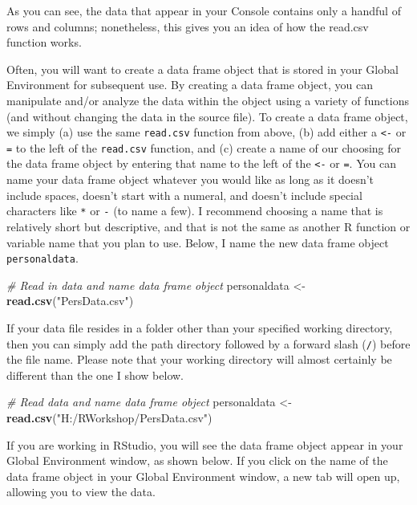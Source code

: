 \documentclass[]{book}
\newenvironment{Shaded}{\begin{snugshade}}{\end{snugshade}}
\newcommand{\KeywordTok}[1]{\textcolor[rgb]{0.13,0.29,0.53}{\textbf{#1}}}
\newcommand{\StringTok}[1]{\textcolor[rgb]{0.31,0.60,0.02}{#1}}
\newcommand{\CommentTok}[1]{\textcolor[rgb]{0.56,0.35,0.01}{\textit{#1}}}
\newcommand{\NormalTok}[1]{#1}
\begin{document}
As you can see, the data that appear in your Console contains only a
handful of rows and columns; nonetheless, this gives you an idea of how
the read.csv function works.

Often, you will want to create a data frame object that is stored in
your Global Environment for subsequent use. By creating a data frame
object, you can manipulate and/or analyze the data within the object
using a variety of functions (and without changing the data in the
source file). To create a data frame object, we simply (a) use the same
\texttt{read.csv} function from above, (b) add either a
\texttt{\textless{}-} or \texttt{=} to the left of the \texttt{read.csv}
function, and (c) create a name of our choosing for the data frame
object by entering that name to the left of the \texttt{\textless{}-} or
\texttt{=}. You can name your data frame object whatever you would like
as long as it doesn't include spaces, doesn't start with a numeral, and
doesn't include special characters like \texttt{*} or \texttt{-} (to
name a few). I recommend choosing a name that is relatively short but
descriptive, and that is not the same as another R function or variable
name that you plan to use. Below, I name the new data frame object
\texttt{personaldata}.

\begin{Shaded}
\begin{Highlighting}[]
\CommentTok{# Read in data and name data frame object}
\NormalTok{personaldata <-}\StringTok{ }\KeywordTok{read.csv}\NormalTok{(}\StringTok{"PersData.csv"}\NormalTok{)}
\end{Highlighting}
\end{Shaded}

If your data file resides in a folder other than your specified working
directory, then you can simply add the path directory followed by a
forward slash (\texttt{/}) before the file name. Please note that your
working directory will almost certainly be different than the one I show
below.

\begin{Shaded}
\begin{Highlighting}[]
\CommentTok{# Read data and name data frame object}
\NormalTok{personaldata <-}\StringTok{ }\KeywordTok{read.csv}\NormalTok{(}\StringTok{"H:/RWorkshop/PersData.csv"}\NormalTok{)}
\end{Highlighting}
\end{Shaded}

If you are working in RStudio, you will see the data frame object appear
in your Global Environment window, as shown below. If you click on the
name of the data frame object in your Global Environment window, a new
tab will open up, allowing you to view the data.
\end{document}
